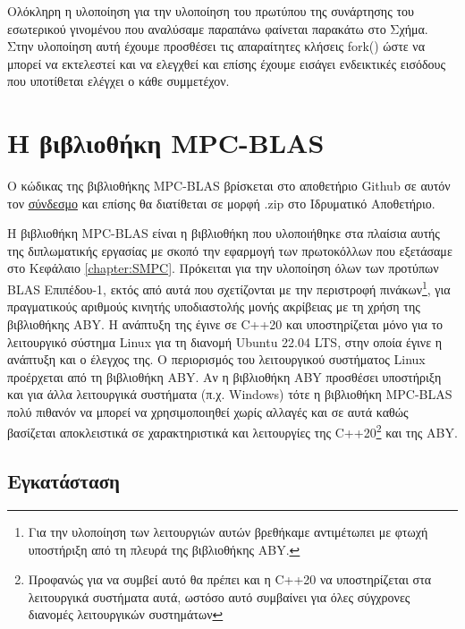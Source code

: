 Ολόκληρη η υλοποίηση για την υλοποίηση του πρωτύπου της συνάρτησης του εσωτερικού γινομένου που αναλύσαμε παραπάνω φαίνεται παρακάτω στο Σχήμα. Στην υλοποίηση αυτή έχουμε προσθέσει τις απαραίτητες κλήσεις fork() ώστε να μπορεί να εκτελεστεί και να ελεγχθεί και επίσης έχουμε εισάγει ενδεικτικές εισόδους που υποτίθεται ελέγχει ο κάθε συμμετέχον.



\section{Η βιβλιοθήκη MPC-BLAS}

Ο κώδικας της βιβλιοθήκης MPC-BLAS βρίσκεται στο αποθετήριο Github σε αυτόν τον \href{https://github.com/st1064870/mpc-blas}{σύνδεσμο} και επίσης θα διατίθεται σε μορφή .zip στο Ιδρυματικό Αποθετήριο.

Η βιβλιοθήκη MPC-BLAS είναι η βιβλιοθήκη που υλοποιήθηκε στα πλαίσια αυτής της διπλωματικής εργασίας με σκοπό την εφαρμογή των πρωτοκόλλων που εξετάσαμε στο Κεφάλαιο \ref{chapter:SMPC}. Πρόκειται για την υλοποίηση όλων των προτύπων BLAS Επιπέδου-1, εκτός από αυτά που σχετίζονται με την περιστροφή πινάκων\footnote{Για την υλοποίηση των λειτουργιών αυτών βρεθήκαμε αντιμέτωπει με φτωχή υποστήριξη από τη πλευρά της βιβλιοθήκης ABY.}, για πραγματικούς αριθμούς κινητής υποδιαστολής μονής ακρίβειας με τη χρήση της βιβλιοθήκης ABY. Η ανάπτυξη της έγινε σε C++20 και υποστηρίζεται μόνο για το λειτουργικό σύστημα Linux για τη διανομή Ubuntu 22.04 LTS, στην οποία έγινε η ανάπτυξη και ο έλεγχος της. Ο περιορισμός του λειτουργικού συστήματος Linux προέρχεται από τη βιβλιοθήκη ABY. Αν η βιβλιοθήκη ABY προσθέσει υποστήριξη και για άλλα λειτουργικά συστήματα (π.χ. Windows) τότε η βιβλιοθήκη MPC-BLAS πολύ πιθανόν να μπορεί να χρησιμοποιηθεί χωρίς αλλαγές και σε αυτά καθώς βασίζεται αποκλειστικά σε χαρακτηριστικά και λειτουργίες της C++20\footnote{Προφανώς για να συμβεί αυτό θα πρέπει και η C++20 να υποστηρίζεται στα λειτουργικά συστήματα αυτά, ωστόσο αυτό συμβαίνει για όλες σύγχρονες διανομές λειτουργικών συστημάτων} και της ABY.

\subsection{Εγκατάσταση}

